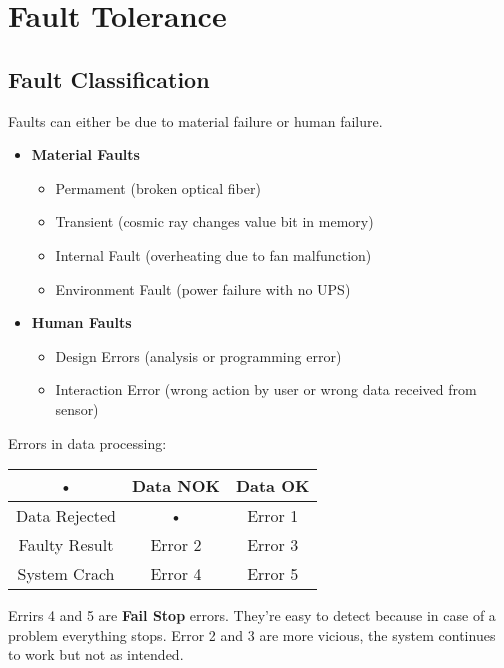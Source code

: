 \documentclass[../main.tex]{subfiles}
\begin{document}
\chapter{Fault Tolerance}

\section{Fault Classification}
Faults can either be due to material failure or human failure. 
\begin{itemize}
	\item \textbf{Material Faults}
	\begin{itemize}
		\item Permament (broken optical fiber)
		\item Transient (cosmic ray changes value bit in memory)
		\item Internal Fault (overheating due to fan malfunction)
		\item Environment Fault (power failure with no UPS)
	\end{itemize}
	\item \textbf{Human Faults}
	\begin{itemize}
		\item Design Errors (analysis or programming error)
		\item Interaction Error (wrong action by user or wrong data received from sensor)
	\end{itemize}
\end{itemize}
Errors in data processing:
\begin{center}
\begin{tabular}{|c|c|c|}
\hline 
• & Data NOK & Data OK \\ 
\hline 
Data Rejected & • & Error 1 \\ 
\hline 
Faulty Result & Error 2 & Error 3 \\ 
\hline 
System Crach & Error 4 & Error 5 \\ 
\hline 
\end{tabular} 
\end{center}
Errirs 4 and 5 are \textbf{Fail Stop} errors. They're easy to detect because in case of a problem everything stops. Error 2 and 3 are more vicious, the system continues to work but not as intended. 
\end{document}
